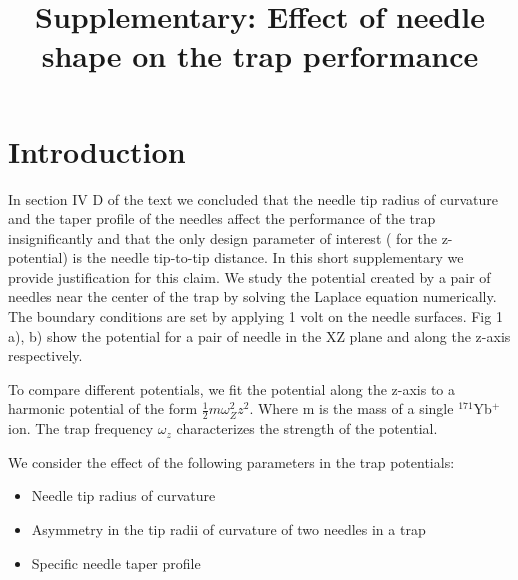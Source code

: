 \documentclass[12pt]{article}
\title{Supplementary: Effect of needle shape on the trap performance}
\begin{document}
\maketitle

\section{Introduction}

In section IV D of the text we concluded that the needle tip radius of curvature and the taper profile of the needles affect the performance of the trap insignificantly and that the only design parameter of interest ( for the z-potential) is the needle tip-to-tip distance. 
In this short supplementary we provide justification for this claim. 
We study the potential created by a pair of needles near the center of the trap by solving the Laplace equation numerically. 
The boundary conditions are set by applying 1 volt on the needle surfaces. 
Fig 1 a), b) show the potential for a pair of needle in the XZ plane and along the z-axis respectively. 

To compare different potentials, we fit the potential along the z-axis to a harmonic potential of the form $ \frac{1}{2} m \omega_Z^2 z^2$. Where m is the mass of a single $^{171}$Yb$^+$ ion. The trap frequency $\omega_z$ characterizes the strength of the potential.

We consider the effect of the following parameters in the trap potentials:

\begin{itemize}
    \item Needle tip radius of curvature
    \item Asymmetry in the tip radii of curvature of two needles in a trap
    \item Specific needle taper profile
\end{itemize}
\end{document}
